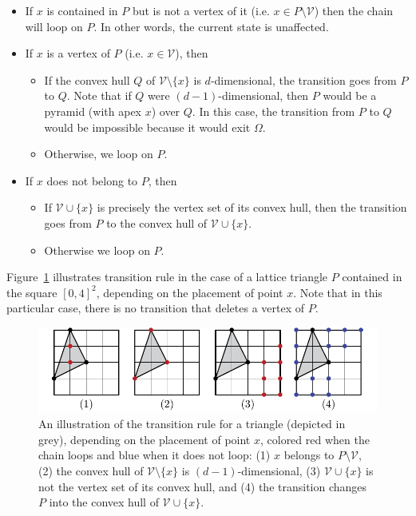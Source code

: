 \documentclass[a4paper]{article}
\begin{document}
\begin{itemize}
\item If $x$ is contained in $P$ but is not a vertex of it (i.e. $x\in{P}\mathord{\setminus}\mathcal{V}$) then the chain will loop on $P$. In other words, the current state is unaffected.
\item If $x$ is a vertex of $P$ (i.e. $x\in\mathcal{V}$), then
  \begin{itemize}
    \item If the convex hull $Q$ of $\mathcal{V}\mathord{\setminus}\{x\}$ is $d$-dimensional, the transition goes from $P$ to $Q$. Note that if $Q$ were $(d-1)$-dimensional, then $P$ would be a pyramid (with apex $x$) over $Q$. In this case, the transition from $P$ to $Q$ would be impossible because it would exit $\Omega$.
    \item Otherwise, we loop on $P$.
  \end{itemize}
  \item If $x$ does not belong to $P$, then
  \begin{itemize}
    \item If $\mathcal{V}\cup\{x\}$ is precisely the vertex set of its convex hull, then the transition goes from $P$ to the convex hull of $\mathcal{V}\cup \{x\}$.
    \item Otherwise we loop on $P$.
  \end{itemize}
\end{itemize}

Figure~\ref{fig:boucle} illustrates transition rule in the case of a lattice triangle $P$ contained in the square $[0,4]^2$, depending on the placement of point $x$. Note that in this particular case, there is no transition that deletes a vertex of $P$.

\begin{figure}[b]
  \begin{center}
    \includegraphics[scale=0.9]{../assets/boucle-mod}
    \caption{An illustration of the transition rule for a triangle (depicted in grey), depending on the placement of point $x$, colored red when the chain loops and blue when it does not loop: (1) $x$ belongs to $P\mathord{\setminus}\mathcal{V}$, (2) the convex hull of $\mathcal{V}\mathord{\setminus}\{x\}$ is $(d-1)$-dimensional, (3) $\mathcal{V}\cup\{x\}$ is not the vertex set of its convex hull, and (4) the transition changes $P$ into the convex hull of $\mathcal{V}\cup\{x\}$.}
    \label{fig:boucle}
  \end{center}
\end{figure}
\end{document}
